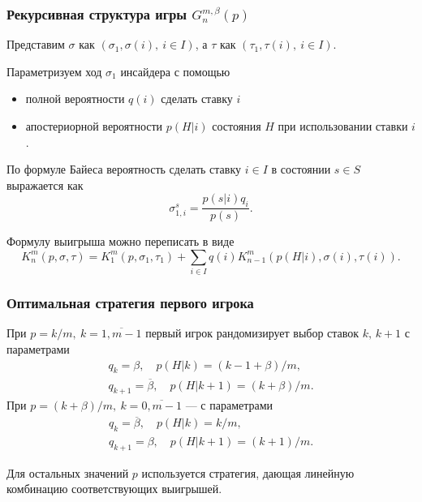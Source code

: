 \documentclass[12pt]{beamer}
\newcommand{\Co}{\beta}
\newcommand{\DCo}{\overline{\beta}}
\begin{document}
\begin{frame}
  \frametitle{Рекурсивная структура игры $G^{m, \Co}_n(p)$}
  
  Представим $\sigma$ как $(\sigma_1, \sigma(i),\ i \in I)$, а $\tau$ как $(\tau_1, \tau(i),\ i \in I)$.

  Параметризуем ход $\sigma_1$ инсайдера с помощью 
  \begin{itemize}
  \item
    полной вероятности $q(i)$ сделать ставку $i$
  \item
    апостериорной вероятности $p(H|i)$ состояния $H$ при использовании ставки $i$.
  \end{itemize}
  По формуле Байеса вероятность сделать ставку $i \in I$ в состоянии $s \in S$ выражается как
  \[
    \sigma^s_{1,i} = \frac{p(s|i)q_i}{p(s)}.
  \]

  Формулу выигрыша можно переписать в виде
  \begin{equation*}
    K^m_n(p, \sigma, \tau) = 
    K^m_1(p, \sigma_1, \tau_1) + 
    \sum_{i \in I} q(i) K^m_{n-1}(p(H|i), \sigma(i), \tau(i)).
  \end{equation*}
\end{frame}

\begin{frame}
  \frametitle{Оптимальная стратегия первого игрока}
  
  При $p = k/m,\ k = \overline{1, m-1}$ первый игрок рандомизирует выбор ставок $k, \, k+1$ с параметрами
  \begin{gather*}
    q_k = \Co, \quad p(H|k) = (k-1+\Co)/m,\\
    q_{k+1} = \DCo, \quad p(H|k + 1) = (k + \Co)/m.
  \end{gather*}
  При $p = (k+\Co)/m,\ k = \overline{0, m-1}$ --- с параметрами
  \begin{gather*}
    q_k = \DCo, \quad p(H|k) = k/m,\\
    q_{k+1} = \Co, \quad p(H|k + 1) = (k+1)/m.
  \end{gather*}
  
  Для остальных значений $p$ используется стратегия, дающая линейную комбинацию соответствующих выигрышей.
\end{frame}
\end{document}
